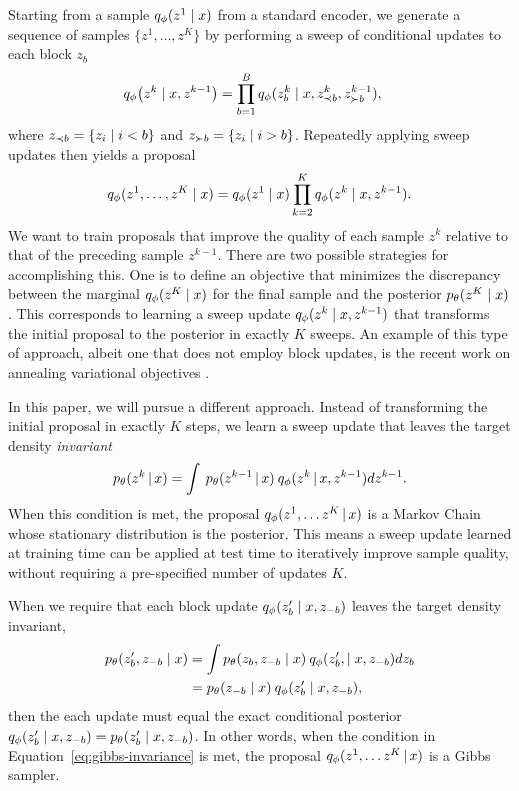 \documentclass{article}
\theoremstyle{definition}
\begin{document}
Starting from a sample $q_\phi(z^{1} \mid x)$ from a standard encoder, we  generate a sequence of samples $\{z^1, \ldots, z^K\}$ by performing a sweep of conditional updates to each block $z_b$
\begin{align}
    \label{eq:approx-gibbs-kernel}
    q_\phi \big( z^k \mid x, z^{k-1} \big)
    &=
    \prod_{b=1}^B
    q_\phi(z^k_b \mid x, z^{k}_{\prec b}, z^{k-1}_{\succ b})
    ,
\end{align}
where $z_{\prec b} = \{z_i \mid i < b\}$ and $z_{\succ b} = \{z_i \mid i > b\}$. Repeatedly applying sweep updates then yields a proposal
\begin{equation*}
    q_\phi(z^1, \ldots, z^K \mid x) 
    =
    q_\phi(z^1 \mid x)
    \prod_{k=2}^K
    q_\phi(z^k \mid x, z^{k-1}).
\end{equation*}
We want to train proposals that improve the quality of each sample $z^k$ relative to that of the preceding sample $z^{k-1}$. There are two possible strategies for accomplishing this. One is to define an objective that minimizes the discrepancy between the marginal $q_\phi(z^K \mid x)$ for the final sample and the posterior $p_\theta(z^K \mid x)$. This corresponds to learning a sweep update $q_\phi(z^k \mid x, z^{k-1})$ that transforms the initial proposal to the posterior in exactly $K$ sweeps. An example of this type of approach, albeit one that does not employ block updates, is the recent work on annealing variational objectives \cite{huang2018improving}.

In this paper, we will pursue a different approach. Instead of transforming the initial proposal in exactly $K$ steps, we learn a sweep update that leaves the target density \emph{invariant}
\begin{equation*}
    p_\theta(z^k \,|\, x) = \int \: p_\theta(z^{k-1} \,|\, x) \: q_\phi(z^k \,|\,x, z^{k-1}) d z^{k-1}.
\end{equation*}
When this condition is met, the proposal $q_\phi(z^1, \ldots z^K \,|\, x)$ is a Markov Chain whose stationary distribution is the posterior. 
This means a sweep update learned at training time can be applied at test time to iteratively improve sample quality, without requiring a pre-specified number of updates $K$.

When we require that each block update $q_\phi(z'_b \mid x, z_{-b})$ leaves the target density invariant, 
\begin{align}
    \label{eq:gibbs-invariance}
    p_\theta(z'_b, z_{-b} \mid x)
    &= 
    \int 
    p_\theta(z_b, z_{-b} \mid x) \:
    q_\phi(z'_b, \mid x, z_{-b}) 
    dz_{b}
    \nonumber
    \\
    &= 
    p_\theta(z_{-b} \mid x) \:
    q_\phi(z'_b \mid x, z_{-b}),
\end{align}
then the each update must equal the exact conditional posterior 
$q_\phi(z'_b \mid x, z_{-b}) = p_\theta(z'_b \mid x, z_{-b})$. In other words, when the condition in Equation~\ref{eq:gibbs-invariance} is met, the proposal $q_\phi(z^1, \ldots z^K \,|\, x)$ is a Gibbs sampler.
\end{document}
